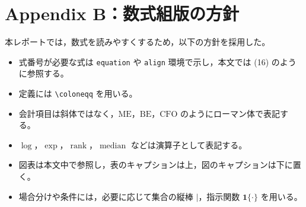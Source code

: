 \documentclass[a4paper,10pt]{article}
\newcommand{\metric}[1]{\mathrm{#1}}
\newcommand{\ind}[1]{\mathbf{1}\{#1\}}
\newcommand{\median}{\operatorname{median}}
\newcommand{\rank}{\operatorname{rank}}
\begin{document}
\section{Appendix B：数式組版の方針}
本レポートでは，数式を読みやすくするため，以下の方針を採用した。
\begin{itemize}
\item 式番号が必要な式は \texttt{equation} や \texttt{align} 環境で示し，本文では (16) のように参照する。
\item 定義には \texttt{\textbackslash coloneqq} を用いる。
\item 会計項目は斜体ではなく，$\metric{ME}$，$\metric{BE}$，$\metric{CFO}$ のようにローマン体で表記する。
\item $\log$，$\exp$，$\rank$，$\median$ などは演算子として表記する。
\item 図表は本文中で参照し，表のキャプションは上，図のキャプションは下に置く。
\item 場合分けや条件には，必要に応じて集合の縦棒 $\mid$，指示関数 $\ind{\cdot}$ を用いる。
\end{itemize}
\end{document}

